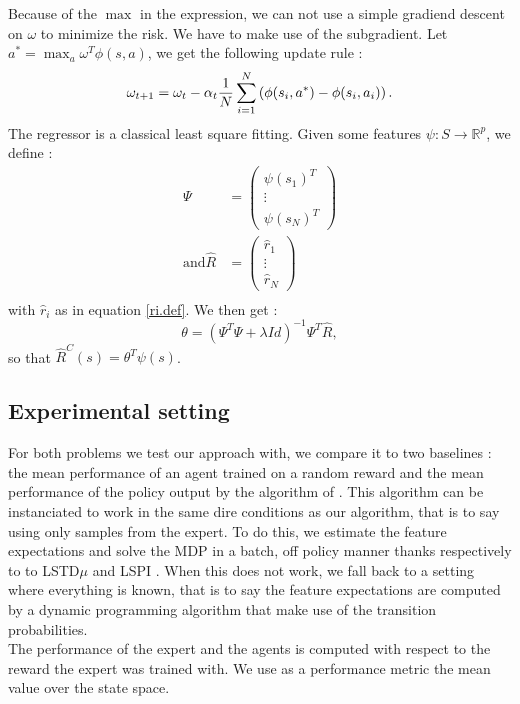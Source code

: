 \documentclass{article} %
\newcommand{\0}{\mathbf{0}}
\newcommand{\1}{\mathbf{1}}
\begin{document}
Because of the $\max$ in the expression, we can not use a simple gradiend descent on $\omega$ to minimize the risk. We have to make use of the subgradient. Let $a^* = \max_a\omega^T\phi(s,a)$, we get the following update rule :
\begin{equation}
  \omega_{t+1} = \omega_t -\alpha_t{1\over N}\sum_{i=1}^N\left(\phi(s_i,a^*) - \phi(s_i,a_i)\right).
\end{equation}
The regressor is a classical least square fitting. Given some features $\psi : S\rightarrow \mathbb{R}^p$, we define :
\begin{eqnarray}
\Psi &= \begin{pmatrix}\psi(s_1)^T\\\vdots\\\psi(s_N)^T\end{pmatrix}\\
\textrm{and}
\hat R &= \begin{pmatrix}\hat r_1 \\\vdots\\\hat r_N\end{pmatrix}\\
\end{eqnarray}
with $\hat r_i$ as in equation \ref{ri.def}. We then get :
\begin{equation}
\theta = (\Psi^T\Psi + \lambda Id)^{-1}\Psi^T\hat R,
\end{equation}
so that $\hat R^C(s) = \theta^T \psi(s)$.\\
\subsection{Experimental setting}
For both problems we test our approach with, we compare it to two baselines : the mean performance of an agent trained on a random reward and the mean performance of the policy output by the algorithm of \cite{abbeel2004apprenticeship}. This algorithm can be instanciated to work in the same dire conditions as our algorithm, that is to say using only samples from the expert. To do this, we estimate the feature expectations and solve the MDP in a batch, off policy manner thanks respectively to to LSTD$\mu$ \cite{klein2011batch} and LSPI \cite{lagoudakis2003least}. When this does not work, we fall back to a setting where everything is known, that is to say the feature expectations are computed by a dynamic programming algorithm that make use of the transition probabilities.\\
The performance of the expert and the agents is computed with respect to the reward the expert was trained with. We use as a performance metric the mean value over the state space.
\end{document}
